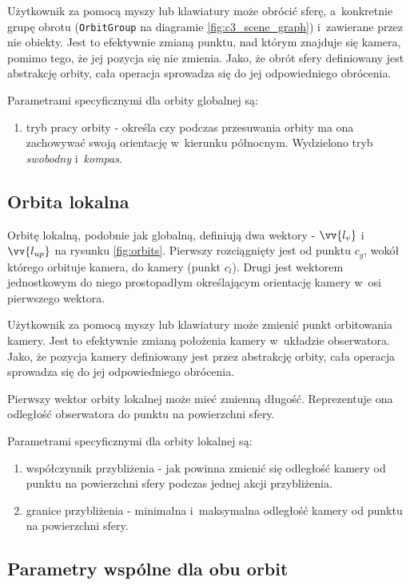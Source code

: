 Użytkownik za pomocą myszy lub klawiatury może obrócić sferę, a~konkretnie grupę obrotu (\texttt{OrbitGroup} na diagramie \ref{fig:c3_scene_graph}) i~zawierane przez nie obiekty. Jest to efektywnie zmianą punktu, nad którym znajduje się kamera, pomimo tego, że jej pozycja się nie zmienia. Jako, że obrót sfery definiowany jest abstrakcję orbity, cała operacja sprowadza się do jej odpowiedniego obrócenia. 

Parametrami specyficznymi dla orbity globalnej są:
\begin{enumerate}
    \item tryb pracy orbity - określa czy podczas przesuwania orbity ma ona zachowywać swoją orientację w~kierunku północnym. Wydzielono tryb \textit{swobodny} i~\textit{kompas}.
\end{enumerate}

\subsection{Orbita lokalna}

Orbitę lokalną, podobnie jak globalną, definiują dwa wektory - $\vv{l_v}$ i~$\vv{l_{up}}$ na rysunku \ref{fig:orbits}. Pierwszy rozciągnięty jest od punktu $c_g$, wokół którego orbituje kamera, do kamery (punkt $c_l$). Drugi jest wektorem jednostkowym do niego prostopadłym określającym orientację kamery w~osi pierwszego wektora.

Użytkownik za pomocą myszy lub klawiatury może zmienić punkt orbitowania kamery. Jest to efektywnie zmianą położenia kamery w~układzie obserwatora. Jako, że pozycja kamery definiowany jest przez abstrakcję orbity, cała operacja sprowadza się do jej odpowiedniego obrócenia.

Pierwszy wektor orbity lokalnej może mieć zmienną długość. Reprezentuje ona odległość obserwatora do punktu na powierzchni sfery. 

Parametrami specyficznymi dla orbity lokalnej są:
\begin{enumerate}
    \item współczynnik przybliżenia - jak powinna zmienić się odległość kamery od punktu na powierzchni sfery podczas jednej akcji przybliżenia.
    \item granice przybliżenia - minimalna i~maksymalna odległość kamery od punktu na powierzchni sfery.
\end{enumerate}

\subsection{Parametry wspólne dla obu orbit}

